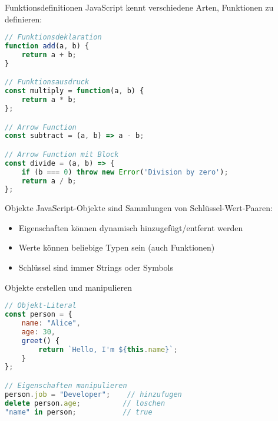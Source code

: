 \begin{KR}{Funktionsdefinitionen}
JavaScript kennt verschiedene Arten, Funktionen zu definieren:
\begin{lstlisting}[language=JavaScript, style=basesmol]
// Funktionsdeklaration
function add(a, b) {
    return a + b;
}

// Funktionsausdruck
const multiply = function(a, b) {
    return a * b;
};

// Arrow Function
const subtract = (a, b) => a - b;

// Arrow Function mit Block
const divide = (a, b) => {
    if (b === 0) throw new Error('Division by zero');
    return a / b;
};
\end{lstlisting}
\end{KR}

\begin{definition}{Objekte}
    JavaScript-Objekte sind Sammlungen von Schlüssel-Wert-Paaren:
    \begin{itemize}
        \item Eigenschaften können dynamisch hinzugefügt/entfernt werden
        \item Werte können beliebige Typen sein (auch Funktionen)
        \item Schlüssel sind immer Strings oder Symbols
    \end{itemize}
\end{definition}

\begin{examplecode}{Objekte erstellen und manipulieren}
\begin{lstlisting}[language=JavaScript, style=basesmol]
// Objekt-Literal
const person = {
    name: "Alice",
    age: 30,
    greet() {
        return `Hello, I'm ${this.name}`;
    }
};

// Eigenschaften manipulieren
person.job = "Developer";    // hinzufugen
delete person.age;          // loschen
"name" in person;           // true
\end{lstlisting}
\end{examplecode}

